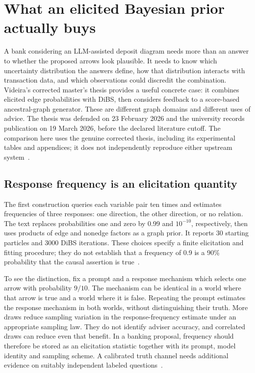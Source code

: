 \section{What an elicited Bayesian prior actually buys}
\label{exec18:bayesian-advice}
A bank considering an LLM-assisted deposit diagram needs more than an answer to whether the proposed arrows look plausible. It needs to know which uncertainty distribution the answers define, how that distribution interacts with transaction data, and which observations could discredit the combination. Videira's corrected master's thesis provides a useful concrete case: it combines elicited edge probabilities with DiBS, then considers feedback to a score-based ancestral-graph generator. These are different graph domains and different uses of advice. The thesis was defended on 23 February 2026 and the university records publication on 19 March 2026, before the declared literature cutoff. The comparison here uses the genuine corrected thesis, including its experimental tables and appendices; it does not independently reproduce either upstream system~\citep{exec18_videira_thesis}.

\subsection{Response frequency is an elicitation quantity}
The first construction queries each variable pair ten times and estimates frequencies of three responses: one direction, the other direction, or no relation. The text replaces probabilities one and zero by 0.99 and $10^{-10}$, respectively, then uses products of edge and nonedge factors as a graph prior. It reports 30 starting particles and 3000 DiBS iterations. These choices specify a finite elicitation and fitting procedure; they do not establish that a frequency of 0.9 is a 90\% probability that the causal assertion is true~\citep{exec18_videira_thesis}.

To see the distinction, fix a prompt and a response mechanism which selects one arrow with probability $9/10$. The mechanism can be identical in a world where that arrow is true and a world where it is false. Repeating the prompt estimates the response mechanism in both worlds, without distinguishing their truth. More draws reduce sampling variation in the response-frequency estimate under an appropriate sampling law. They do not identify adviser accuracy, and correlated draws can reduce even that benefit. In a banking proposal, frequency should therefore be stored as an elicitation statistic together with its prompt, model identity and sampling scheme. A calibrated truth channel needs additional evidence on suitably independent labeled questions~\citep{exec18_bayesian_reference}.

